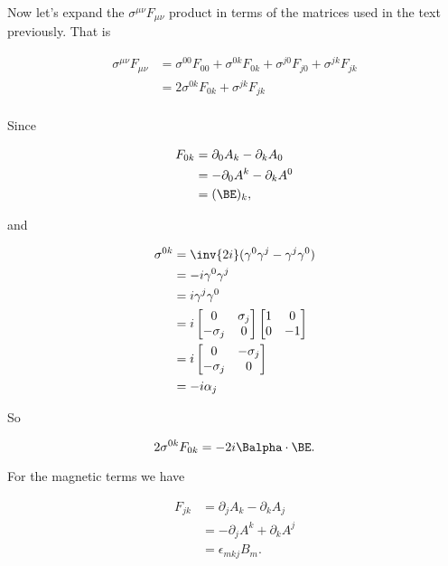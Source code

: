 Now let's expand the $\sigma^{\mu \nu} F_{\mu \nu}$ product in terms of the matrices used in the text previously.  That is

\begin{align*}
\sigma^{\mu \nu} F_{\mu \nu}
&=
\sigma^{0 0} F_{0 0}
+\sigma^{0 k} F_{0 k}
+\sigma^{j 0} F_{j 0}
+\sigma^{j k} F_{j k} \\
&=
2 \sigma^{0 k} F_{0 k}
+\sigma^{j k} F_{j k} \\
\end{align*}

Since 

\begin{align*}
F_{0 k}
&=
\partial_0 A_k -\partial_k A_0 \\
&=
-\partial_0 A^k -\partial_k A^0 \\
&= (\BE)_k,
\end{align*}

and

\begin{align*}
\sigma^{0 k}
&=
\inv{2 i} (\gamma^0 \gamma^j - \gamma^j \gamma^0) \\
&=
-i \gamma^0 \gamma^j  \\
&=
i \gamma^j \gamma^0  \\
&=
i
\begin{bmatrix}
0 & \sigma_j \\
-\sigma_j & 0
\end{bmatrix}
\begin{bmatrix}
1 & 0 \\
0 & -1
\end{bmatrix} \\
&= 
i
\begin{bmatrix}
0 & -\sigma_j \\
-\sigma_j & 0
\end{bmatrix} \\
&=
-i \alpha_j
\end{align*}

So

\begin{equation}\label{eqn:diracCovariant:n}
2 \sigma^{0 k} F_{0 k} = -2 i \Balpha \cdot \BE.
\end{equation}

For the magnetic terms we have

\begin{align*}
F_{j k} 
&= \partial_j A_k - \partial_k A_j \\
&= -\partial_j A^k + \partial_k A^j \\
&= \epsilon_{m k j} B_m.
\end{align*}

